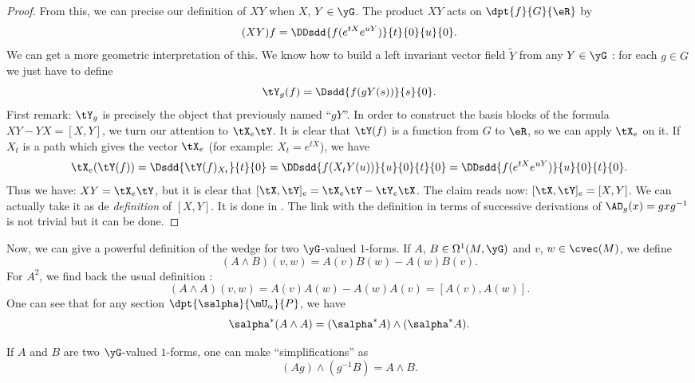 \begin{proof}
From this, we can precise our definition of $XY$ when $X$, $Y\in\yG$. The product $XY$ acts on $\dpt{f}{G}{\eR}$ by
\[
  (XY)f=\DDsdd{f(e^{tX}e^{uY})}{t}{0}{u}{0}.
\]
We can get a more geometric interpretation of this. We know how to build a left invariant vector field $\tilde Y$ from any $Y\in\yG$ : for each $g\in G$ we just have to define
\[
  \tY_g(f)=\Dsdd{f(gY(s))}{s}{0}.
\]
%
First remark: $\tY_g$ is precisely the object that previously named ``$gY$''. In order to construct the basis blocks of the formula $XY-YX=[X,Y]$, we turn our attention to $\tX_e\tY$. It is clear that $\tY(f)$ is a function from $G$ to $\eR$, so we can apply $\tX_e$ on it. If $X_t$ is a path which gives the vector $\tX_e$ (for example: $X_t=e^{tX}$), we have
\begin{equation}
  \tX_e(\tY(f))=\Dsdd{\tY(f)_{X_t}}{t}{0}\\
               =\DDsdd{f(X_tY(u))}{u}{0}{t}{0}\\
	       =\DDsdd{f(e^{tX}e^{uY})}{u}{0}{t}{0}.
\end{equation}
Thus we have: $XY=\tX_e\tY$, but it is clear that $[\tX,\tY]_e=\tX_e\tY-\tY_e\tX$. The claim reads now: $[\tX,\tY]_e=[X,Y]$. We can actually take it as de \emph{definition} of $[X,Y]$. It is done in \cite{Helgason}. The link with the definition in terms of successive derivations of $\AD_g(x)=gxg^{-1}$ is not trivial but it can be done. 
\end{proof}



Now, we can give a powerful definition of the wedge for two $\yG$-valued $1$-forms. If $A$, $B\in\Omega^1(M,\yG)$ and $v$, $w\in\cvec(M)$, we define
\begin{equation}
  (A\wedge B)(v,w)=A(v)B(w)-A(w)B(v).
\end{equation}
For $A^2$, we find back the usual definition :
\[
  (A\wedge A)(v,w)=A(v)A(w)-A(w)A(v)=[A(v),A(w)].
\]
%
One can see that for any section $\dpt{\salpha}{\mU_{\alpha}}{P}$, we have
\begin{equation}\label{eq:1907r2}
   \salpha^*(A\wedge A)=(\salpha^*A)\wedge(\salpha^*A).
\end{equation}


\begin{lemma}
If $A$ and $B$ are two $\yG$-valued $1$-forms, one can make  ``simplifications'' as
\begin{equation}
 (Ag)\wedge(g^{-1} B)=A\wedge B.
\end{equation}
\label{lem:simplif}
\end{lemma}

